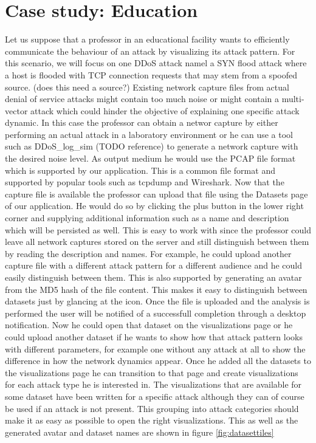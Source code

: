 \section{Case study: Education}
Let us suppose that a professor in an educational facility wants to efficiently communicate the behaviour of an attack by visualizing its attack pattern. For this scenario, we will focus on one DDoS attack namel a SYN flood attack where a host is flooded with TCP connection requests that may stem from a spoofed source. (does this need a source?)
Existing network capture files from actual denial of service attacks might contain too much noise or might contain a multi-vector attack which could hinder the objective of explaining one specific attack dynamic. In this case the professor can obtain a networ capture by either performing an actual attack in a laboratory environment or he can use a tool such as DDoS\_log\_sim (TODO reference) to generate a network capture with the desired noise level. As output medium he would use the PCAP file format which is supported by our application. This is a common file format and supported by popular tools such as tcpdump and Wireshark.
Now that the capture file is available the professor can upload that file using the Datasets page of our application. He would do so by clicking the plus button in the lower right corner and supplying additional information such as a name and description which will be persisted as well. This is easy to work with since the professor could leave all network captures stored on the server and still distinguish between them by reading the description and names. For example, he could upload another capture file with a different attack pattern for a different audience and he could easily distinguish between them. This is also supported by generating an avatar from the MD5 hash of the file content. This makes it easy to distinguish between datasets just by glancing at the icon. Once the file is uploaded and the analysis is performed the user will be notified of a successfull completion through a desktop notification. Now he could open that dataset on the visualizations page or he could upload another dataset if he wants to show how that attack pattern looks with different parameters, for example one without any attack at all to show the difference in how the network dynamics appear.
Once he added all the datasets to the visualizations page he can transition to that page and create visualizations for each attack type he is interested in. The visualizations that are available for some dataset have been written for a specific attack although they can of course be used if an attack is not present. This grouping into attack categories should make it as easy as possible to open the right visualizations. This as well as the generated avatar and dataset names are shown in figure \ref{fig:datasettiles}

